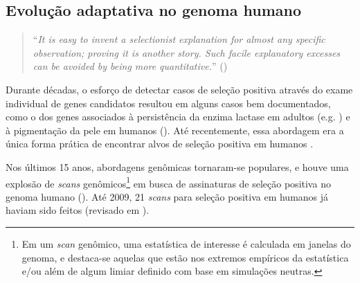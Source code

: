 \begin{refsection}
\section{Evolução adaptativa no genoma humano} %
\medskip
\begin{quotation}
\enquote{\emph{It is easy to invent a selectionist explanation for almost any specific observation; proving it is another story. Such facile explanatory excesses can be avoided by being more quantitative.}}   (\cite{Kimura1983})
\end{quotation}
\medskip
%
	Durante décadas, o esforço de detectar casos de seleção positiva através do exame individual de genes candidatos resultou em alguns casos bem documentados, como o dos genes associados à persistência da enzima lactase em adultos (e.g. \cite{Bersaglieri2004}) e à pigmentação da pele em humanos (\cite{Jablonski2010}). Até recentemente, essa abordagem era a única forma prática de encontrar alvos de seleção positiva em humanos \parencite{Sabeti2006}. 

    Nos últimos 15 anos, abordagens genômicas tornaram-se populares, e houve uma explosão de \emph{scans} genômicos\footnote{Em um \emph{scan} genômico, uma estatística de interesse é calculada em janelas do genoma, e destaca-se aquelas que estão nos extremos empíricos da estatística e/ou além de algum limiar definido com base em simulações neutras.} em busca de assinaturas de seleção positiva no genoma humano (\cite{Bamshad2003,Bustamante2005,Enard2010,Fay2001,Nielsen2005,Sabeti2006,Sabeti2007}). Até 2009, 21 \emph{scans} para seleção positiva em humanos já haviam sido feitos (revisado em \cite{Akey2009}).
    

\end{refsection}
